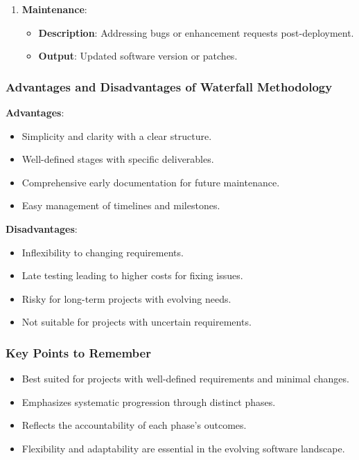 \documentclass{beamer}
\begin{document}
\begin{frame}[fragile]
\begin{enumerate}
\begin{itemize}
                \item \textbf{Description}: Releasing the software to the production environment.
                \item \textbf{Output}: Deployment of the software.
            \end{itemize}
        \item \textbf{Maintenance}:
            \begin{itemize}
                \item \textbf{Description}: Addressing bugs or enhancement requests post-deployment.
                \item \textbf{Output}: Updated software version or patches.
            \end{itemize}
    \end{enumerate}
\end{frame}

\begin{frame}[fragile]
    \frametitle{Advantages and Disadvantages of Waterfall Methodology}
    \textbf{Advantages}:
    \begin{itemize}
        \item Simplicity and clarity with a clear structure.
        \item Well-defined stages with specific deliverables.
        \item Comprehensive early documentation for future maintenance.
        \item Easy management of timelines and milestones.
    \end{itemize}

    \textbf{Disadvantages}:
    \begin{itemize}
        \item Inflexibility to changing requirements.
        \item Late testing leading to higher costs for fixing issues.
        \item Risky for long-term projects with evolving needs.
        \item Not suitable for projects with uncertain requirements.
    \end{itemize}
\end{frame}

\begin{frame}[fragile]
    \frametitle{Key Points to Remember}
    \begin{itemize}
        \item Best suited for projects with well-defined requirements and minimal changes.
        \item Emphasizes systematic progression through distinct phases.
        \item Reflects the accountability of each phase's outcomes.
        \item Flexibility and adaptability are essential in the evolving software landscape.
    \end{itemize}
\end{frame}
\end{document}
